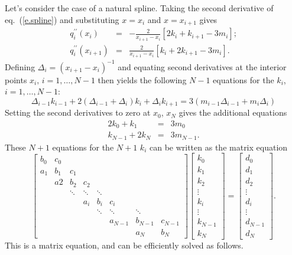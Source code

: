 Let's consider the case of a natural spline. Taking the second derivative of eq.~(\ref{e.spline}) and substituting $x=x_{i}$ and $x=x_{i+1}$ gives
\begin{eqnarray}
\label{e.d2spline-left}
q^{\prime\prime}_{i}(x_{i}) &=& -\frac{2}{x_{i+1}-x_{i}}\left[ 2k_{i} + k_{i+1} - 3m_{i} \right];\\
\label{e.d2spline-right}
q^{\prime\prime}_{i}(x_{i+1}) &=& \frac{2}{x_{i+1}-x_{i}}\left[ k_{i} + 2k_{i+1} - 3m_{i} \right].
\end{eqnarray}
Defining $\Delta_{i} = (x_{i+1}-x_{i})^{-1}$ and equating second derivatives at the interior points $x_{i},\,i=1,\ldots,N-1$ then yields the following $N-1$ equations for the $k_{i}$, $i=1,\ldots,N-1$:
\begin{equation}
\Delta_{i-1}k_{i-1} + 2\left(\Delta_{i-1} + \Delta_{i}\right) k_{i} + \Delta_{i}k_{i+1} = 3\left(m_{i-1}\Delta_{i-1} + m_{i}\Delta_{i}\right)
\end{equation}
Setting the second derivatives to zero at $x_{0}$, $x_{N}$ gives the additional equations
\begin{eqnarray}
2k_{0} + k_{1} &=& 3m_{0}\\
k_{N-1} + 2k_{N} &=& 3m_{N-1}.
\end{eqnarray}
These $N+1$ equations for the $N+1$ $k_{i}$ can be written as the matrix equation
\[
\left[\begin{array}{ccccccccccc}
	b_{0} & c_{0} \\
	a_{1} & b_{1} & c_{1} \\
	& a{2} & b_{2} & c_{2}\\
	& & \ddots & \ddots & \ddots \\
	& & & a_{i} & b_{i} & c_{i} \\
	& & & & \ddots & \ddots & \ddots \\
	& & & & & a_{N-1} & b_{N-1} & c_{N-1} \\
	& & & & & & a_{N} & b_{N} 
\end{array}\right]
\left[\begin{array}{c}
	k_{0}\\
	k_{1}\\
	k_{2}\\
	\vdots\\
	k_{i}\\
	\vdots\\
	k_{N-1}\\
	k_{N}
\end{array}\right] = 
\left[\begin{array}{c}
	d_{0}\\
	d_{1}\\
	d_{2}\\
	\vdots\\
	d_{i}\\
	\vdots\\
	d_{N-1}\\
	d_{N}
\end{array}\right].
\]
This is a  matrix equation, and can be efficiently solved as follows.

